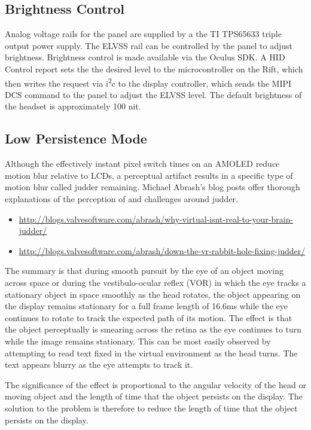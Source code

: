 \documentclass[letterpaper]{article}
\begin{document}
\subsection{Brightness Control}
Analog voltage rails for the panel are supplied by a the TI TPS65633 triple output power supply.  The ELVSS rail can be controlled by the panel to adjust brightness.  Brightness control is made available via the Oculus SDK.  A HID Control report sets the the desired level to the microcontroller on the Rift, which then writes the request via i\textsuperscript{2}c to the display controller, which sends the MIPI DCS command to the panel to adjust the ELVSS level.  The default brightness of the headset is approximately 100 nit.

\subsection{Low Persistence Mode}
Although the effectively instant pixel switch times on an AMOLED reduce motion blur relative to LCDs, a perceptual artifact results in a specific type of motion blur called judder remaining.  Michael Abrash's blog posts offer thorough explanations of the perception of and challenges around judder.

\begin{itemize}
  \item \url{http://blogs.valvesoftware.com/abrash/why-virtual-isnt-real-to-your-brain-judder/}
  \item \url{http://blogs.valvesoftware.com/abrash/down-the-vr-rabbit-hole-fixing-judder/}
\end{itemize}

The summary is that during smooth pursuit by the eye of an object moving across space or during the vestibulo-ocular reflex (VOR) in which the eye tracks a stationary object in space smoothly as the head rotates, the object appearing on the display remains stationary for a full frame length of 16.6ms while the eye continues to rotate to track the expected path of its motion.  The effect is that the object perceptually is smearing across the retina as the eye continues to turn while the image remains stationary.  This can be most easily observed by attempting to read text fixed in the virtual environment as the head turns.  The text appears blurry as the eye attempts to track it.

The significance of the effect is proportional to the angular velocity of the head or moving object and the length of time that the object persists on the display.  The solution to the problem is therefore to reduce the length of time that the object persists on the display.
\end{document}
